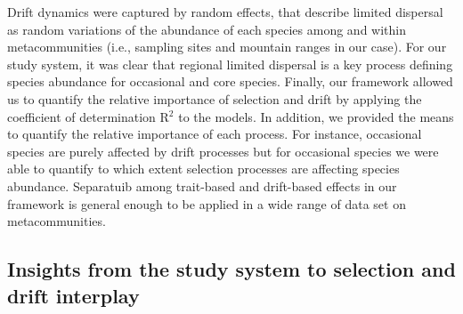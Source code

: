 \documentclass[12pt]{article}
\begin{document}
Drift dynamics were captured by random effects, that describe limited dispersal as random variations of the abundance of each species
among and within metacommunities (i.e., sampling sites and mountain ranges in our case). For our study system, it was clear that regional limited dispersal is a key process defining species abundance for occasional and core species. Finally, our framework allowed us to quantify the relative importance of selection and drift by applying the coefficient of determination R{$^2$} \citep{Nakagawa2013, Nakagawa2017} to the models. In addition, we provided the means to quantify the relative importance of each process. For instance, occasional species are purely affected by drift processes but for occasional species we were able to quantify to which extent selection processes are affecting species abundance. Separatuib among trait-based and drift-based effects in our framework is general enough to be applied in a wide range of data set on metacommunities.


\subsection*{Insights from the study system to selection and drift interplay}
\end{document}
